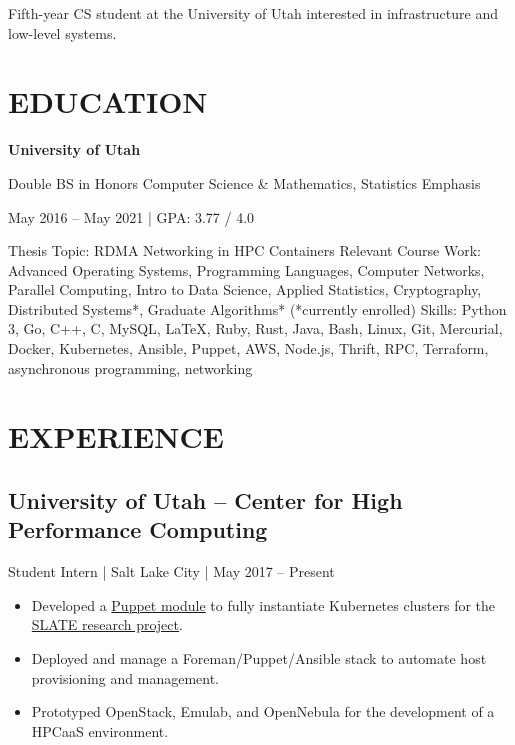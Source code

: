 \documentclass[10pt, letterpaper]{resume}
\begin{document}
\maketitle

{\centering
 Fifth-year CS student at the University of Utah interested in infrastructure and low-level systems.
 \par
}

\section{EDUCATION}
 {\centering
  \textbf{University of Utah}

  Double BS in Honors Computer Science \& Mathematics, Statistics Emphasis

  May 2016 -- May 2021 | GPA: 3.77 / 4.0

  \par
 }
\vspace{10pt}
{{\selectfont Thesis Topic:} RDMA Networking in HPC Containers}
\smallbreak%
{{\selectfont Relevant Course Work:}
Advanced Operating Systems, Programming Languages, Computer Networks, Parallel Computing, Intro to Data Science, Applied Statistics, Cryptography, Distributed Systems*, Graduate Algorithms* {\footnotesize(*currently enrolled)}}
\smallbreak%
{{\selectfont Skills:} Python 3, Go, C++, C, MySQL, \LaTeX, Ruby, Rust, Java, Bash, Linux, Git, Mercurial, Docker, Kubernetes, Ansible, Puppet, AWS, Node.js, Thrift, RPC, Terraform, asynchronous programming, networking}

\section{EXPERIENCE}
\subsection{University of Utah -- Center for High Performance Computing}
Student Intern | Salt Lake City | May 2017 -- Present
\begin{itemize}
    \item Developed a \href{https://github.com/slateci/slate-puppet}{Puppet module} to fully instantiate Kubernetes clusters for the \href{https://slateci.io}{SLATE research project}.
    \item Deployed and manage a Foreman/Puppet/Ansible stack to automate host provisioning and management.
 \item Prototyped OpenStack, Emulab, and OpenNebula for the development of a HPCaaS environment.
\end{itemize}
\end{document}
